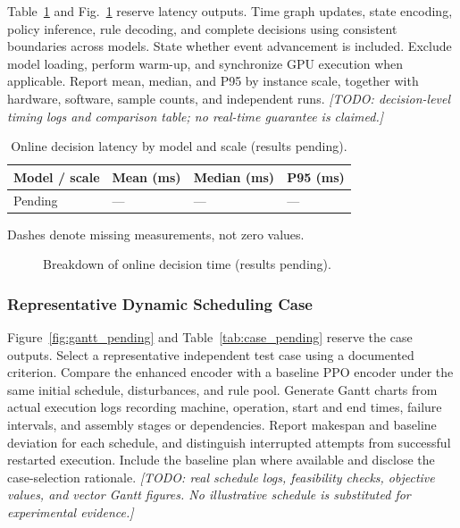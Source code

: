 Table~\ref{tab:latency_pending} and Fig.~\ref{fig:latency_pending} reserve latency outputs. Time graph updates, state encoding, policy inference, rule decoding, and complete decisions using
consistent boundaries across models. State whether event advancement is included. Exclude model
loading, perform warm-up, and synchronize GPU execution when applicable. Report mean, median,
and P95 by instance scale, together with hardware, software, sample counts, and independent runs.
\textit{[TODO: decision-level timing logs and comparison table; no real-time guarantee is claimed.]}


\begin{table}[t]
\centering
\caption{Online decision latency by model and scale (results pending).}
\label{tab:latency_pending}
\footnotesize
\setlength{\tabcolsep}{3pt}
\begin{tabular*}{\linewidth}{@{\extracolsep{\fill}}llll@{}}
\toprule
Model / scale & Mean (ms) & Median (ms) & P95 (ms) \\
\midrule
Pending & --- & --- & --- \\
\bottomrule
\end{tabular*}
\par\smallskip
{\footnotesize Dashes denote missing measurements, not zero values.}
\end{table}

\begin{figure}[t]
\centering
{}
\caption{Breakdown of online decision time (results pending).}
\label{fig:latency_pending}
\end{figure}

\subsubsection{Representative Dynamic Scheduling Case}
\label{subsubsec:gantt_case}
Figure~\ref{fig:gantt_pending} and Table~\ref{tab:case_pending} reserve the case outputs. Select a representative independent test case using a documented criterion. Compare the enhanced
encoder with a baseline PPO encoder under the same initial schedule, disturbances, and rule pool.
Generate Gantt charts from actual execution logs recording machine, operation, start and end times,
failure intervals, and assembly stages or dependencies. Report makespan and baseline deviation for
each schedule, and distinguish interrupted attempts from successful restarted execution. Include the
baseline plan where available and disclose the case-selection rationale.
\textit{[TODO: real schedule logs, feasibility checks, objective values, and vector Gantt figures.
No illustrative schedule is substituted for experimental evidence.]}


